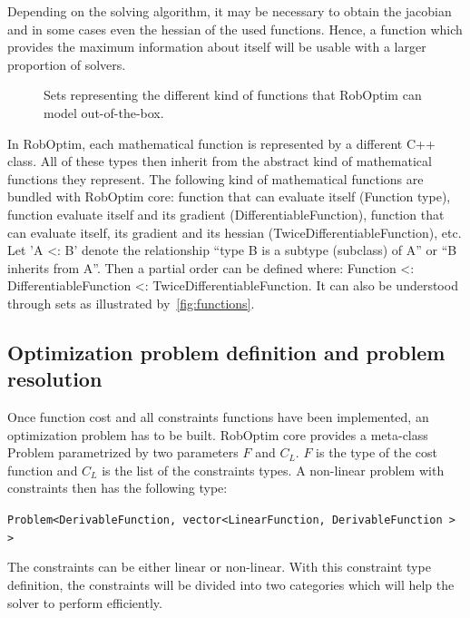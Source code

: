 \documentclass[conference,final,a4paper,twocolumn,9pt]{IEEEtran}
\begin{document}
Depending on the solving algorithm, it may be necessary to obtain the
jacobian and in some cases even the hessian of the used
functions. Hence, a function which provides the maximum information
about itself will be usable with a larger proportion of solvers.

\begin{figure}
  \begin{center}
  \end{center}
  \caption{Sets representing the different kind of functions that
    RobOptim can model out-of-the-box.}\label{fig:functions}
\end{figure}

In RobOptim, each mathematical function is represented by a different
C++ class. All of these types then inherit from the abstract kind of
mathematical functions they represent. The following kind of
mathematical functions are bundled with RobOptim core: function that
can evaluate itself (Function type), function evaluate itself and its
gradient (DifferentiableFunction), function that can evaluate itself,
its gradient and its hessian (TwiceDifferentiableFunction), etc.  Let
'A <: B' denote the relationship ``type B is a subtype (subclass) of
A'' or ``B inherits from A''. Then a partial order can be defined
where: Function <: DifferentiableFunction <:
TwiceDifferentiableFunction. It can also be understood through sets
as illustrated by~\autoref{fig:functions}.


\subsection{Optimization problem definition and problem resolution}


Once function cost and all constraints functions have been
implemented, an optimization problem has to be built. RobOptim core
provides a meta-class Problem parametrized by two parameters $F$ and
$C_L$. $F$ is the type of the cost function and $C_L$ is the list of
the constraints types. A non-linear problem with constraints then has
the following type:


\texttt{Problem<DerivableFunction, vector<LinearFunction, DerivableFunction > >}


The constraints can be either linear or non-linear. With this
constraint type definition, the constraints will be divided into two
categories which will help the solver to perform efficiently.
\end{document}

